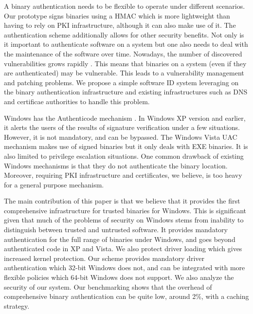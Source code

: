 A binary authentication needs to be flexible to operate under different scenarios.
Our prototype signs binaries using a HMAC \cite{rfc2104} which is more lightweight
than having to rely on PKI infrastructure, although it can also make use of it.
The authentication scheme additionally allows for other security benefits.
Not only is it important to authenticate software on a system but one also needs
to deal with the maintenance of the software over time.
Nowadays, the number of discovered vulnerabilities grows rapidly 
\cite{CERT-vul}.
This means that binaries on a system (even if they are authenticated) may
be vulnerable. This leads to a vulnerability management and patching problems.
We propose a simple software ID system leveraging on the binary
authentication infrastructure and existing infrastructures such as DNS and certificae authorities
to handle this problem.

Windows has the Authenticode mechanism \cite{authenticode}.
In Windows XP version and earlier, 
it alerts the users of the results of signature verification under
a few situations. However, it is not mandatory, and can be bypassed.
The Windows Vista UAC mechanism makes use of signed binaries but it only
deals with EXE binaries. It is also limited to privilege escalation situations.
One common drawback of existing Windows mechanisms is that they do not 
authenticate the binary location.
Moreover, requiring PKI infrastructure and certificates, 
we believe, is too heavy for a general purpose mechanism.

The main contribution of this paper is that we believe that it provides the first
comprehensive infrastructure for trusted binaries for Windows.
This is significant given that much of the problems of security on Windows stems from
inability to distinguish between trusted and untrusted software.
It provides mandatory authentication for the full range of binaries under Windows, and goes beyond
authenticated code in XP and Vista.
We also protect driver loading which gives increased kernel protection.
Our scheme provides mandatory driver authentication which 32-bit Windows does not,
and can be integrated with more flexible policies which 64-bit Windows does not support.
We also analyze the security of our system. 
Our benchmarking shows that the overhead of comprehensive binary
authentication can be quite low, around 2\%,
with a caching strategy.

